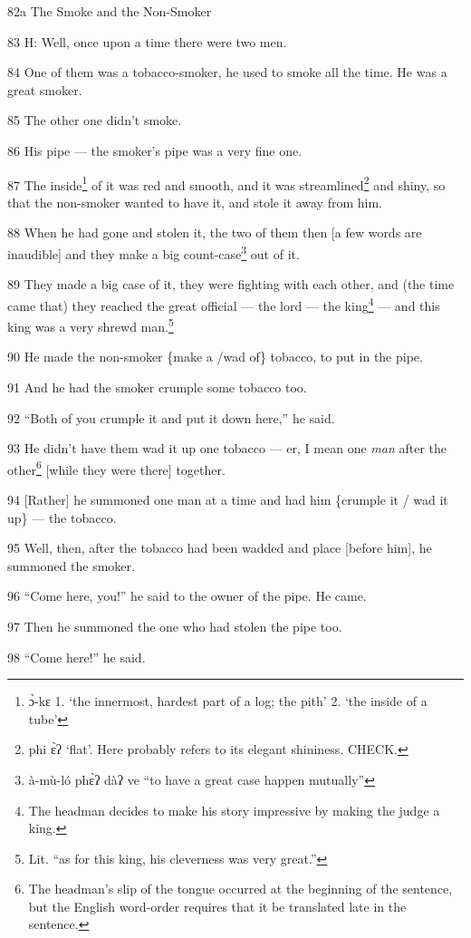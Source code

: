 
82a The Smoke and the Non-Smoker

83 H: Well, once upon a time there were two men.

84 One of them was a tobacco-smoker, he used to smoke all the time. He was a great
smoker.

85 The other one didn't smoke.

86 His pipe --- the smoker's pipe was a very fine one.

87 The inside\footnote{ɔ̀-kɛ 1. `the innermost, hardest part of a log; the pith' 2. `the inside of a tube'} of it was red and smooth, and it was streamlined\footnote{phi ɛ̀ʔ `flat'. Here probably refers to its elegant shininess. CHECK.} and shiny,
so that the non-smoker wanted to have it, and stole it away from him.

88 When he had gone and stolen it, the two of them then [a few words are inaudible]
and they make a big count-case\footnote{à-mù-ló phɛ̀ʔ dàʔ ve ``to have a great case happen mutually''} out of it.

89 They made a big case of it, they were fighting with each other, and (the time
came that) they reached the great official --- the lord --- the king\footnote{The headman decides to make his story impressive by making the judge a king.} --- and
this king was a very shrewd man.\footnote{Lit. ``as for this king, his cleverness was very great.''}

90 He made the non-smoker \{make a /wad of\} tobacco, to put in the pipe.

91 And he had the smoker crumple some tobacco too.

92 ``Both of you crumple it and put it down here,'' he said.

93 He didn't have them wad it up one tobacco --- er, I mean one \textit{man} after
the other\footnote{The headman's slip of the tongue occurred at the beginning of the sentence, but the English word-order requires that it be translated late in the sentence.} [while they were there] together.

94 [Rather] he summoned one man at a time and had him \{crumple it / wad it up\}
--- the tobacco.

95 Well, then, after the tobacco had been wadded and place [before him], he summoned
the smoker.

96 ``Come here, you!'' he said to the owner of the pipe. He came.

97 Then he summoned the one who had stolen the pipe too.

98 ``Come here!'' he said.

